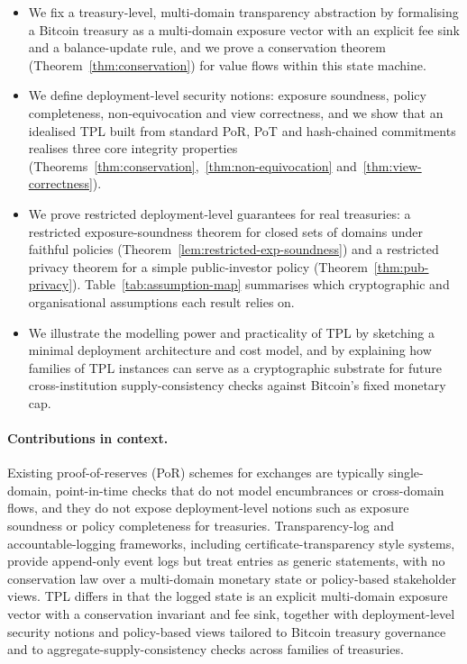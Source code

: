 \documentclass[11pt]{article}
\begin{document}
\begin{itemize}[noitemsep]
\item We fix a treasury-level, multi-domain transparency abstraction by formalising a Bitcoin treasury as a multi-domain exposure vector with an explicit fee sink and a balance-update rule, and we prove a conservation theorem (Theorem~\ref{thm:conservation}) for value flows within this state machine.
\item We define deployment-level security notions: exposure soundness, policy completeness, non-equivocation and view correctness, and we show that an idealised TPL built from standard PoR, PoT and hash-chained commitments realises three core integrity properties (Theorems~\ref{thm:conservation},~\ref{thm:non-equivocation} and~\ref{thm:view-correctness}).
\item We prove restricted deployment-level guarantees for real treasuries: a restricted exposure-soundness theorem for closed sets of domains under faithful policies (Theorem~\ref{lem:restricted-exp-soundness}) and a restricted privacy theorem for a simple public-investor policy (Theorem~\ref{thm:pub-privacy}). Table~\ref{tab:assumption-map} summarises which cryptographic and organisational assumptions each result relies on.
\item We illustrate the modelling power and practicality of TPL by sketching a minimal deployment architecture and cost model, and by explaining how families of TPL instances can serve as a cryptographic substrate for future cross-institution supply-consistency checks against Bitcoin's fixed monetary cap.
\end{itemize}

\paragraph{Contributions in context.}
Existing proof-of-reserves (PoR) schemes for exchanges are typically single-domain, point-in-time checks that do not model encumbrances or cross-domain flows, and they do not expose deployment-level notions such as exposure soundness or policy completeness for treasuries.
Transparency-log and accountable-logging frameworks, including certificate-transparency style systems, provide append-only event logs but treat entries as generic statements, with no conservation law over a multi-domain monetary state or policy-based stakeholder views.
TPL differs in that the logged state is an explicit multi-domain exposure vector with a conservation invariant and fee sink, together with deployment-level security notions and policy-based views tailored to Bitcoin treasury governance and to aggregate-supply-consistency checks across families of treasuries.
\end{document}
